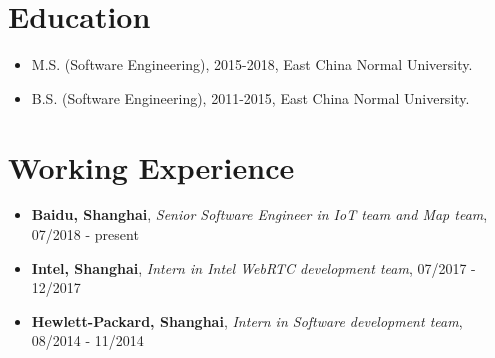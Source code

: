 \documentclass[letterpaper, UTF8]{article}
\begin{document}
	\section*{\textbf{Education}}\vspace{-0.05in}
	\begin{itemize}
		\item M.S. (Software Engineering), 2015-2018, East China Normal University.
		\item B.S. (Software Engineering), 2011-2015, East China Normal University.
	\end{itemize}	
	\vspace{-0.32in}
	
	\section*{\textbf{Working Experience}}\vspace{-0.05in}
	\begin{itemize}
		\item \textbf{Baidu, Shanghai}, \emph{Senior Software Engineer in IoT team and Map team}, 07/2018 - present
		\item \textbf{Intel, Shanghai}, \emph{Intern in Intel WebRTC development team}, 07/2017 - 12/2017
		\item \textbf{Hewlett-Packard, Shanghai}, \emph{Intern in Software development team}, 08/2014 - 11/2014
	\end{itemize}
	\vspace{-0.32in}
	
\end{document}
